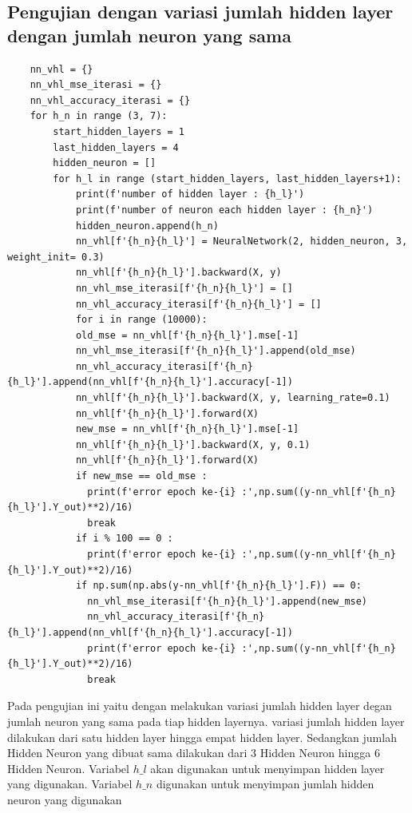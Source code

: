 \subsection{Pengujian dengan variasi jumlah hidden layer dengan jumlah neuron yang sama}

\begin{lstlisting}
    nn_vhl = {}
    nn_vhl_mse_iterasi = {}
    nn_vhl_accuracy_iterasi = {}
    for h_n in range (3, 7):
        start_hidden_layers = 1
        last_hidden_layers = 4
        hidden_neuron = []
        for h_l in range (start_hidden_layers, last_hidden_layers+1):
            print(f'number of hidden layer : {h_l}')
            print(f'number of neuron each hidden layer : {h_n}')
            hidden_neuron.append(h_n)
            nn_vhl[f'{h_n}{h_l}'] = NeuralNetwork(2, hidden_neuron, 3, weight_init= 0.3)
            nn_vhl[f'{h_n}{h_l}'].backward(X, y)
            nn_vhl_mse_iterasi[f'{h_n}{h_l}'] = []
            nn_vhl_accuracy_iterasi[f'{h_n}{h_l}'] = []
            for i in range (10000):
            old_mse = nn_vhl[f'{h_n}{h_l}'].mse[-1]
            nn_vhl_mse_iterasi[f'{h_n}{h_l}'].append(old_mse)
            nn_vhl_accuracy_iterasi[f'{h_n}{h_l}'].append(nn_vhl[f'{h_n}{h_l}'].accuracy[-1])
            nn_vhl[f'{h_n}{h_l}'].backward(X, y, learning_rate=0.1)
            nn_vhl[f'{h_n}{h_l}'].forward(X)
            new_mse = nn_vhl[f'{h_n}{h_l}'].mse[-1]
            nn_vhl[f'{h_n}{h_l}'].backward(X, y, 0.1)
            nn_vhl[f'{h_n}{h_l}'].forward(X)
            if new_mse == old_mse :
              print(f'error epoch ke-{i} :',np.sum((y-nn_vhl[f'{h_n}{h_l}'].Y_out)**2)/16)
              break
            if i % 100 == 0 :
              print(f'error epoch ke-{i} :',np.sum((y-nn_vhl[f'{h_n}{h_l}'].Y_out)**2)/16)
            if np.sum(np.abs(y-nn_vhl[f'{h_n}{h_l}'].F)) == 0:
              nn_vhl_mse_iterasi[f'{h_n}{h_l}'].append(new_mse)
              nn_vhl_accuracy_iterasi[f'{h_n}{h_l}'].append(nn_vhl[f'{h_n}{h_l}'].accuracy[-1])
              print(f'error epoch ke-{i} :',np.sum((y-nn_vhl[f'{h_n}{h_l}'].Y_out)**2)/16)
              break
\end{lstlisting}

Pada pengujian ini yaitu dengan melakukan variasi jumlah hidden layer degan jumlah neuron yang sama pada tiap hidden layernya. variasi jumlah hidden layer dilakukan dari satu hidden layer hingga empat hidden layer. Sedangkan jumlah Hidden Neuron yang dibuat sama dilakukan dari 3 Hidden Neuron hingga 6 Hidden Neuron. Variabel $h\_l$ akan digunakan untuk menyimpan hidden layer yang digunakan. Variabel $h\_n$ digunakan untuk menyimpan jumlah hidden neuron yang digunakan

